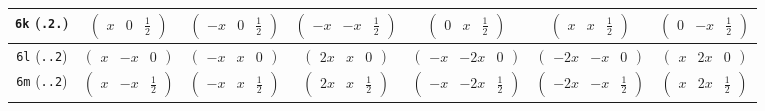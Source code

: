 \documentclass[fleqn,9pt,landscape]{jsarticle}
\begin{document}
\begin{center}
\begin{longtable}{ccccccc}
{\tt 6k} ({\tt .2.}) & $ \begin{pmatrix} x & 0 & \frac{1}{2} \end{pmatrix} $ & $ \begin{pmatrix} - x & 0 & \frac{1}{2} \end{pmatrix} $ & $ \begin{pmatrix} - x & - x & \frac{1}{2} \end{pmatrix} $ & $ \begin{pmatrix} 0 & x & \frac{1}{2} \end{pmatrix} $ & $ \begin{pmatrix} x & x & \frac{1}{2} \end{pmatrix} $ & $ \begin{pmatrix} 0 & - x & \frac{1}{2} \end{pmatrix} $ \\ \hline
{\tt 6l} ({\tt ..2}) & $ \begin{pmatrix} x & - x & 0 \end{pmatrix} $ & $ \begin{pmatrix} - x & x & 0 \end{pmatrix} $ & $ \begin{pmatrix} 2 x & x & 0 \end{pmatrix} $ & $ \begin{pmatrix} - x & - 2 x & 0 \end{pmatrix} $ & $ \begin{pmatrix} - 2 x & - x & 0 \end{pmatrix} $ & $ \begin{pmatrix} x & 2 x & 0 \end{pmatrix} $ \\ \hline
{\tt 6m} ({\tt ..2}) & $ \begin{pmatrix} x & - x & \frac{1}{2} \end{pmatrix} $ & $ \begin{pmatrix} - x & x & \frac{1}{2} \end{pmatrix} $ & $ \begin{pmatrix} 2 x & x & \frac{1}{2} \end{pmatrix} $ & $ \begin{pmatrix} - x & - 2 x & \frac{1}{2} \end{pmatrix} $ & $ \begin{pmatrix} - 2 x & - x & \frac{1}{2} \end{pmatrix} $ & $ \begin{pmatrix} x & 2 x & \frac{1}{2} \end{pmatrix} $ \\ \hline

\end{longtable}
\end{center}
\end{document}
